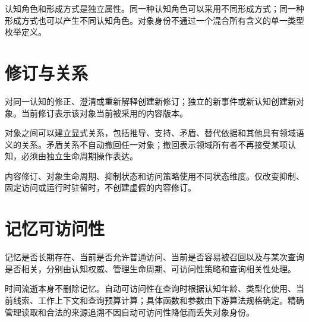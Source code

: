 认知角色和形成方式是独立属性。同一种认知角色可以采用不同形成方式；同一种形成方式也可以产生不同认知角色。对象身份不通过一个混合所有含义的单一类型枚举定义。

\section{修订与关系}

对同一认知的修正、澄清或重新解释创建新修订；独立的新事件或新认知创建新对象。当前修订表示该对象当前被采用的内容版本。

对象之间可以建立显式关系，包括推导、支持、矛盾、替代依据和其他具有领域语义的关系。矛盾关系不自动撤回任一对象；撤回表示领域所有者不再接受某项认知，必须由独立生命周期操作表达。

内容修订、对象生命周期、抑制状态和访问策略使用不同状态维度。仅改变抑制、固定访问或运行时驻留时，不创建虚假的内容修订。

\section{记忆可访问性}

记忆是否长期存在、当前是否允许普通访问、当前是否容易被召回以及与某次查询是否相关，分别由认知权威、管理生命周期、可访问性策略和查询相关性处理。

时间流逝本身不删除记忆。自动可访问性在查询时根据认知年龄、类型化使用、当前线索、工作上下文和查询预算计算；具体函数和参数由下游算法规格确定。精确管理读取和合法的来源追溯不因自动可访问性降低而丢失对象身份。
